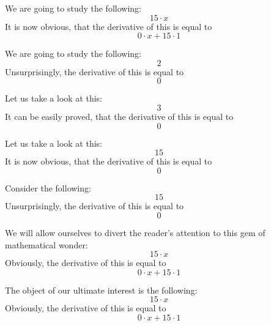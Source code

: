 \documentclass{article}
\begin{document}
We are going to study the following:
\begin{equation}
15 \cdot x 
\end{equation}
It is now obvious, that the derivative of this is equal to
\begin{equation}
0 \cdot x + 15 \cdot 1 
\end{equation}

We are going to study the following:
\begin{equation}
2 
\end{equation}
Unsurprisingly, the derivative of this is equal to
\begin{equation}
0 
\end{equation}

Let us take a look at this:
\begin{equation}
3 
\end{equation}
It can be easily proved, that the derivative of this is equal to
\begin{equation}
0 
\end{equation}

Let us take a look at this:
\begin{equation}
15 
\end{equation}
It is now obvious, that the derivative of this is equal to
\begin{equation}
0 
\end{equation}

Consider the following:
\begin{equation}
15 
\end{equation}
Unsurprisingly, the derivative of this is equal to
\begin{equation}
0 
\end{equation}

We will allow ourselves to divert the reader's attention to this gem of mathematical wonder:
\begin{equation}
15 \cdot x 
\end{equation}
Obviously, the derivative of this is equal to
\begin{equation}
0 \cdot x + 15 \cdot 1 
\end{equation}

The object of our ultimate interest is the following:
\begin{equation}
15 \cdot x 
\end{equation}
Obviously, the derivative of this is equal to
\begin{equation}
0 \cdot x + 15 \cdot 1 
\end{equation}
\end{document}
